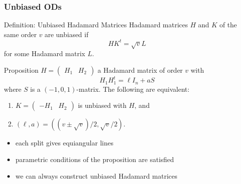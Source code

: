 \documentclass{beamer}
\begin{document}

\subsubsection{Unbiased ODs}

\begin{frame}

  \begin{block}{Definition: Unbiased Hadamard Matrices}
    Hadamard matrices $H$ and $K$ of the same order $v$ are unbiased if
    \[
      HK^t = \sqrt{v}L
    \]
    for some Hadamard matrix $L$.
  \end{block}
  
\end{frame}

\begin{frame}

  \begin{block}{Proposition \cite[][]{splittable-hadamard}}
    $H = \left( \begin{smallmatrix} H_1 & H_2 \end{smallmatrix} \right)$ a
    Hadamard matrix of order $v$ with
    \[
      H_1H_1^t = \ell I_n + aS
    \]
    where $S$ is a $(-1,0,1)$-matrix. The following are equivalent:
    \begin{enumerate}
    \item $K = \left( \begin{smallmatrix} -H_1 & H_2 \end{smallmatrix}
      \right)$ is unbiased with $H$, and
    \item $(\ell,a) = ((v \pm \sqrt{v})/2,\sqrt{v}/2)$.
    \end{enumerate}
  \end{block}

  \begin{itemize}
  \item each split gives equiangular lines
  \item parametric conditions of the proposition are satisfied
  \item we can always construct unbiased Hadamard matrices
  \end{itemize}
  
\end{frame}
\end{document}
